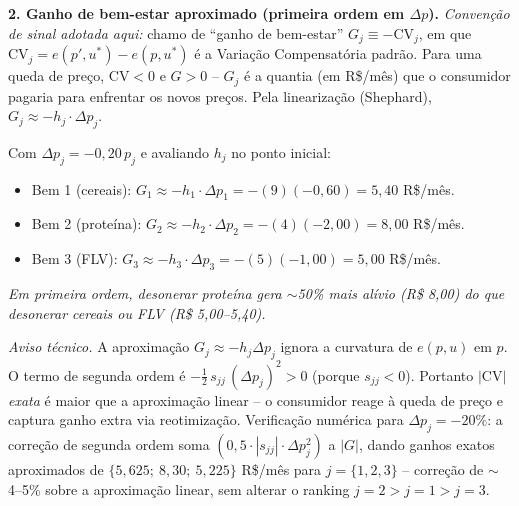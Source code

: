 \documentclass[11pt,addpoints]{exam}
\begin{document}
\begin{spacing}{1.3}
\begin{questions}
\begin{solution}
\textbf{2. Ganho de bem-estar aproximado (primeira ordem em $\Delta p$).} \emph{Convenção de sinal adotada aqui:} chamo de ``ganho de bem-estar'' $G_j \equiv -\mathrm{CV}_j$, em que $\mathrm{CV}_j = e(p', u^*) - e(p, u^*)$ é a Variação Compensatória padrão. Para uma queda de preço, $\mathrm{CV} < 0$ e $G > 0$ -- $G_j$ é a quantia (em R\$/mês) que o consumidor pagaria para enfrentar os novos preços. Pela linearização (Shephard), $G_j \approx -h_j\cdot \Delta p_j$.

Com $\Delta p_j = -0{,}20\, p_j$ e avaliando $h_j$ no ponto inicial:
\begin{itemize}[noitemsep]
\item Bem 1 (cereais): $G_1 \approx -h_1\cdot \Delta p_1 = -(9)(-0{,}60) = 5{,}40$ R\$/mês.
\item Bem 2 (proteína): $G_2 \approx -h_2\cdot \Delta p_2 = -(4)(-2{,}00) = 8{,}00$ R\$/mês.
\item Bem 3 (FLV): $G_3 \approx -h_3\cdot \Delta p_3 = -(5)(-1{,}00) = 5{,}00$ R\$/mês.
\end{itemize}
\emph{Em primeira ordem, desonerar proteína gera $\sim$50\% mais alívio (R\$ 8,00) do que desonerar cereais ou FLV (R\$ 5,00--5,40).}

\textit{Aviso técnico.} A aproximação $G_j \approx -h_j \Delta p_j$ ignora a curvatura de $e(p, u)$ em $p$. O termo de segunda ordem é $-\tfrac12\, s_{jj}\, (\Delta p_j)^2 > 0$ (porque $s_{jj} < 0$). Portanto $|\mathrm{CV}|$ \emph{exata} é maior que a aproximação linear -- o consumidor reage à queda de preço e captura ganho extra via reotimização. Verificação numérica para $\Delta p_j = -20\%$: a correção de segunda ordem soma $(0{,}5 \cdot |s_{jj}| \cdot \Delta p_j^2)$ a $|G|$, dando ganhos exatos aproximados de $\{5{,}625;\ 8{,}30;\ 5{,}225\}$ R\$/mês para $j=\{1,2,3\}$ -- correção de $\sim$4--5\% sobre a aproximação linear, sem alterar o ranking $j=2 > j=1 > j=3$.


\end{solution}
\end{questions}
\end{spacing}
\end{document}
